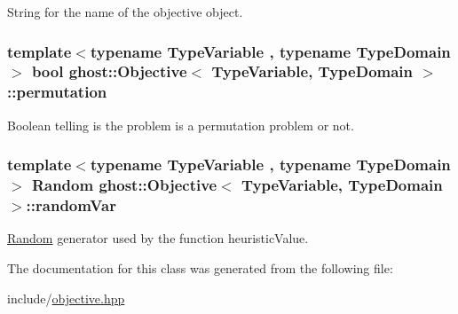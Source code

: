 String for the name of the objective object. 

\hypertarget{classghost_1_1Objective_aae8345f4b7981f4b386eb58e447e0286}{
\subsubsection[{permutation}]{\setlength{\rightskip}{0pt plus 5cm}template$<$typename Type\-Variable , typename Type\-Domain $>$ bool {\bf ghost\-::\-Objective}$<$ Type\-Variable, Type\-Domain $>$\-::permutation\hspace{0.3cm}{\ttfamily [protected]}}}\label{classghost_1_1Objective_aae8345f4b7981f4b386eb58e447e0286}


Boolean telling is the problem is a permutation problem or not. 

\hypertarget{classghost_1_1Objective_a442da333edc70f47c33a15987c2a81b8}{
\subsubsection[{random\-Var}]{\setlength{\rightskip}{0pt plus 5cm}template$<$typename Type\-Variable , typename Type\-Domain $>$ {\bf Random} {\bf ghost\-::\-Objective}$<$ Type\-Variable, Type\-Domain $>$\-::random\-Var\hspace{0.3cm}{\ttfamily [protected]}}}\label{classghost_1_1Objective_a442da333edc70f47c33a15987c2a81b8}


\hyperlink{classghost_1_1Random}{Random} generator used by the function heuristic\-Value. 



The documentation for this class was generated from the following file\-:\begin{DoxyCompactItemize}
\item 
include/\hyperlink{objective_8hpp}{objective.\-hpp}\end{DoxyCompactItemize}
